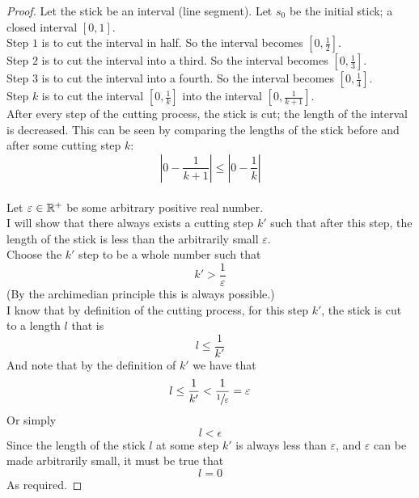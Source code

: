 \documentclass[11pt]{ekblite}
\begin{document}
\begin{example}
	\begin{proof}
		Let the stick be an interval (line segment). Let $s_0$ be the initial stick; a closed interval $[0,1]$.
		\\[0.2in]Step $1$ is to cut the interval in half. So the interval becomes $\left[0,\frac{1}{2}\right]$.
		\\[0.2in]Step $2$ is to cut the interval into a third. So the interval becomes $\left[0,\frac{1}{3}\right]$.
		\\[0.2in]Step $3$ is to cut the interval into a fourth. So the interval becomes $\left[0,\frac{1}{4}\right]$.
		\\[0.2in]Step $k$ is to cut the interval $\left[0,\frac{1}{k}\right]$ into the interval $\left[0,\frac{1}{k+1}\right]$.
		\\[0.2in]After every step of the cutting process, the stick is cut; the length of the interval is decreased. This can be seen by comparing the lengths of the stick before and after some cutting step $k$:
		\[\left| 0 - \frac{1}{k+1} \right| \le \left| 0 - \frac{1}{k} \right|\] 
		\\[0.2in]Let $\varepsilon \in \mathbb{R}^+$ be some arbitrary positive real number.
		\\[0.2in]I will show that there always exists a cutting step $k'$ such that after this step, the length of the stick is less than the arbitrarily small $\varepsilon$. 
		\\[0.2in]Choose the $k'$ step to be a whole number such that
		\[k' > \frac{1}{\varepsilon}\]
		(By the archimedian principle this is always possible.)
		\\[0.2in]I know that by definition of the cutting process, for this step $k'$, the stick is cut to a length $l$ that is
		\[l \le \frac{1}{k'}\] 
		And note that by the definition of $k'$ we have that
		\[l \le \frac{1}{k'} < \frac{1}{\sfrac{1}{\varepsilon}} = \varepsilon\]
		Or simply
		\[l < \epsilon\]
		Since the length of the stick $l$ at some step $k'$ is always less than $\varepsilon$, and $\varepsilon$ can be made arbitrarily small, it must be true that 
		\[l = 0\] 
		As required.
	\end{proof}
\end{example}
\end{document}
